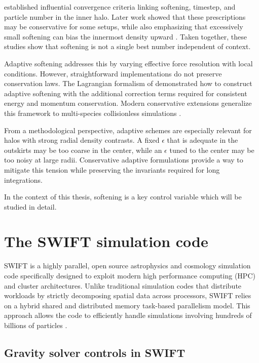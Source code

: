 \cite{power2003inner} established influential convergence criteria linking softening, timestep, and particle number in the inner halo. Later work showed that these prescriptions may be conservative for some setups, while also emphasizing that excessively small softening can bias the innermost density upward \citep{zhang2019optimal}. Taken together, these studies show that softening is not a single best number independent of context.

Adaptive softening addresses this by varying effective force resolution with local conditions. However, straightforward implementations do not preserve conservation laws. The Lagrangian formalism of \cite{price2007energy} demonstrated how to construct adaptive softening with the additional correction terms required for consistent energy and momentum conservation. Modern conservative extensions generalize this framework to multi-species collisionless simulations \citep{hopkins2023novel}.

From a methodological perspective, adaptive schemes are especially relevant for halos with strong radial density contrasts. A fixed $\epsilon$ that is adequate in the outskirts may be too coarse in the center, while an $\epsilon$ tuned to the center may be too noisy at large radii. Conservative adaptive formulations provide a way to mitigate this tension while preserving the invariants required for long integrations.

In the context of this thesis, softening is a key control variable which will be studied in detail.

\section{The SWIFT simulation code}

SWIFT is a highly parallel, open source astrophysics and cosmology simulation code specifically designed to exploit modern high performance computing (HPC) and cluster architectures. Unlike traditional simulation codes that distribute workloads by strictly decomposing spatial data across processors, SWIFT relies on a hybrid shared and distributed memory task-based parallelism model. This approach allows the code to efficiently handle simulations involving hundreds of billions of particles \citep{schaller2024swift}.

\subsection{Gravity solver controls in SWIFT}
\label{sec:bg_solver_controls}

